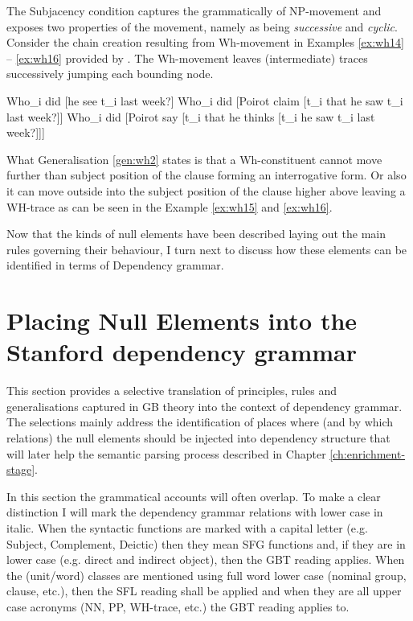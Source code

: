     The Subjacency condition captures the grammatically of NP-movement and exposes two properties of the movement, namely as being \textit{successive} and \textit{cyclic}. Consider the chain creation resulting from Wh-movement in Examples \ref{ex:wh14} -- \ref{ex:wh16} provided by \citet[403--406]{Haegeman1991}. The Wh-movement leaves (intermediate) traces successively jumping each bounding node. 

    \begin{exe}
    	\ex\label{ex:wh14} Who_{i} did [he see t_{i} last week?]
    	\ex\label{ex:wh15} Who_{i} did [Poirot claim [t_{i} that he saw t_{i} last week?]]
    	\ex\label{ex:wh16} Who_{i} did [Poirot say [t_{i} that he thinks [t_{i} he saw t_{i} last week?]]]
    \end{exe}

    What Generalisation \ref{gen:wh2} states is that a Wh-constituent cannot move further than subject position of the clause forming an interrogative form. Or also it can move outside into the subject position of the clause higher above leaving a WH-trace as can be seen in the Example \ref{ex:wh15} and \ref{ex:wh16}.

    Now that the kinds of null elements have been described laying out the main rules governing their behaviour, I turn next to discuss how these elements can be identified in terms of Dependency grammar. 

\section{Placing Null Elements into the Stanford dependency grammar}
\label{sec:placing-null-elements}

    This section provides a selective translation of principles, rules and generalisations captured in GB theory into the context of dependency grammar. The selections mainly address the identification of places where (and by which relations) the null elements should be injected into dependency structure that will later help the semantic parsing process described in Chapter \ref{ch:enrichment-stage}. 

    In this section the grammatical accounts will often overlap. To make a clear distinction I will mark the dependency grammar relations with lower case in italic. When the syntactic functions are marked with a capital letter (e.g. Subject, Complement, Deictic) then they mean SFG functions and, if they are in lower case (e.g. direct and indirect object), then the GBT reading applies. When the (unit/word) classes are mentioned using full word lower case (nominal group, clause,  etc.), then the SFL reading shall be applied and when they are all upper case acronyms (NN, PP, WH-trace, etc.) the GBT reading applies to.

